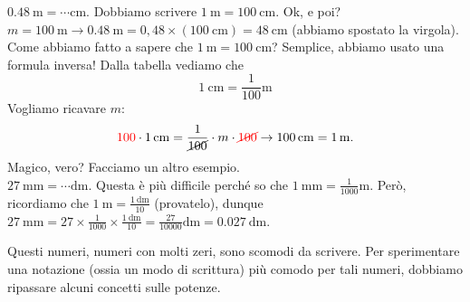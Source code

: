 \begin{testexample}
$\SI{0,48}{\meter} = \cdots \si{\centi\meter}$. Dobbiamo scrivere $\SI{1}{\meter} = \SI{100}{\centi\meter}$. Ok, e poi? $m=\SI{100}{\meter} \rightarrow \SI{0,48}{\meter} = 0,48\times\left(\SI{100}{\centi\meter}\right) = \SI{48}{\centi\meter}$ (abbiamo spostato la virgola). Come abbiamo fatto a sapere che  $\SI{1}{\meter} = \SI{100}{\centi\meter}$? Semplice, abbiamo usato una formula inversa! Dalla tabella vediamo che 
\[
\SI{1}{\centi\meter} = \frac{1}{100}\si{\meter}
\]
Vogliamo ricavare $m$:
\[
\textcolor{red}{100}\cdot \SI{1}{\centi\meter} = \frac{1}{\cancel{100}}\cdot m \cdot \textcolor{red}{\cancel{100}} \rightarrow \SI{100}{\centi\meter}  = \SI{1}{\meter}.
\]
Magico, vero? Facciamo un altro esempio.\\

$\SI{27}{\milli\meter} = \cdots \si{\deca\meter}$. Questa è più difficile perché so che $ \SI{1}{\milli\meter}  = \frac{1}{1000} \si{\meter}$. Però, ricordiamo che $ \SI{1}{\meter}  = \frac
{\SI{1}{\deca\meter}}{10}$ (provatelo), dunque $ \SI{27}{\milli\meter}  = 27\times \frac
{1}{1000}\times\frac{\SI{1}{\deca\meter}}{10} =\frac{27}{10000}\si{\deca\meter} =\SI{0,027}{\deca\meter}$. 

Questi numeri, numeri con molti zeri, sono scomodi da scrivere. Per sperimentare una notazione (ossia un modo di scrittura) più comodo per tali numeri, dobbiamo ripassare alcuni concetti sulle potenze.
\end{testexample}

